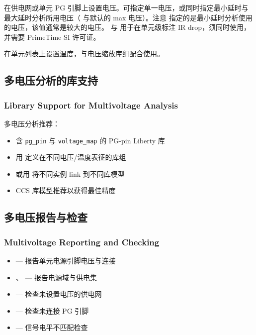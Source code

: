  在供电网或单元 PG 引脚上设置电压。可指定单一电压，或同时指定最小延时与最大延时分析所用电压（ 与默认的 max 电压）。注意  指定的是最小延时分析使用的电压，该值通常是较大的电压。 与  用于在单元级标注 IR drop，须同时使用，并需要 PrimeTime SI 许可证。

 在单元列表上设置温度，与电压缩放库组配合使用。

\subsection{多电压分析的库支持}
\subsubsection*{Library Support for Multivoltage Analysis}

多电压分析推荐：
\begin{itemize}
  \item 含 \texttt{pg\_pin} 与 \texttt{voltage\_map} 的 PG-pin Liberty 库
  \item 用  定义在不同电压/温度表征的库组
  \item 或用  将不同实例 link 到不同库模型
  \item CCS 库模型推荐以获得最佳精度
\end{itemize}

\subsection{多电压报告与检查}
\subsubsection*{Multivoltage Reporting and Checking}

\begin{itemize}
  \item {} — 报告单元电源引脚电压与连接
  \item {}、 — 报告电源域与供电集
  \item {} — 检查未设置电压的供电网
  \item {} — 检查未连接 PG 引脚
  \item {} — 信号电平不匹配检查
\end{itemize}

